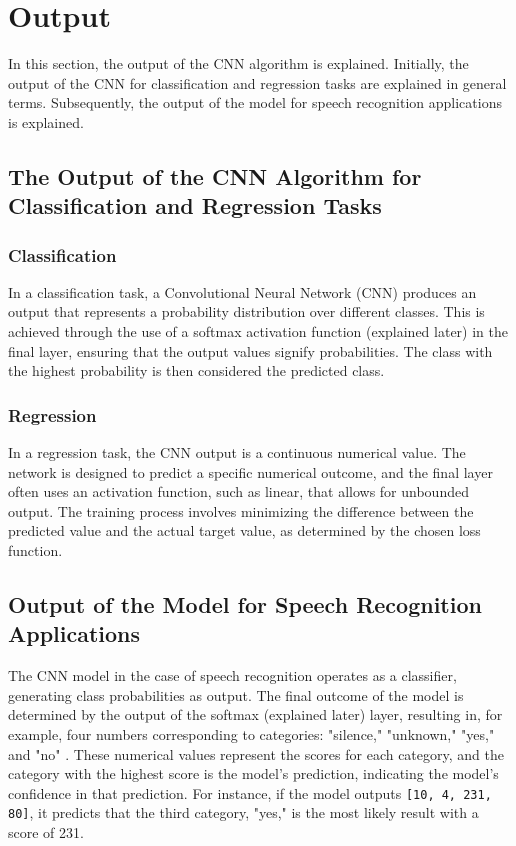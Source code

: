 \section{Output}
\label{key}

In this section, the output of the CNN algorithm is explained. Initially, the output of the CNN for classification and regression tasks are explained in general terms. Subsequently, the output of the model for speech recognition applications is explained.

\subsection{The Output of the CNN Algorithm for Classification and Regression Tasks}

\subsubsection{Classification}

In a classification task, a Convolutional Neural Network (CNN) produces an output that represents a probability distribution over different classes. This is achieved through the use of a softmax activation function (explained later) in the final layer, ensuring that the output values signify probabilities. The class with the highest probability is then considered the predicted class.

\subsubsection{Regression}

In a regression task, the CNN output is a continuous numerical value. The network is designed to predict a specific numerical outcome, and the final layer often uses an activation function, such as linear, that allows for unbounded output. The training process involves minimizing the difference between the predicted value and the actual target value, as determined by the chosen loss function.

\subsection{Output of the Model for Speech Recognition Applications}
\label{subsection:outputCNN}

The CNN model in the case of speech recognition operates as a classifier, generating class probabilities as output. The final outcome of the model is determined by the output of the softmax (explained later) layer, resulting in, for example, four numbers corresponding to categories: "silence," "unknown," "yes," and "no" \cite{Warden:2019}. These numerical values represent the scores for each category, and the category with the highest score is the model's prediction, indicating the model's confidence in that prediction. For instance, if the model outputs \texttt{[10, 4, 231, 80]}, it predicts that the third category, "yes," is the most likely result with a score of 231. 

